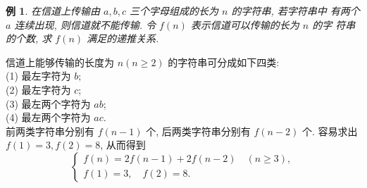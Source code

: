 \documentclass[punct]{ctexbeamer}
\newtheorem{ex}{例}[section]
\def\sol{\noindent {\bf 解\ }}
\begin{document}
\begin{frame}
	\begin{ex}
		在信道上传输由 $a, b, c$ 三个字母组成的长为 $n$ 的字符串, 若字符串中 有两个 $a$ 连续出现, 则信道就不能传输. 令 $f(n)$ 表示信道可以传输的长为 $n$ 的字 符串的个数, 求 $f(n)$ 满足的递推关系.
	\end{ex}
\pause\sol
信道上能够传输的长度为 $n(n \geqslant 2)$ 的字符串可分成如下四类:\\
(1) 最左字符为 $b$;\\
(2) 最左字符为 $c$;\\
(3) 最左两个字符为 $a b$;\\
(4) 最左两个字符为 $a c$.\\
前两类字符串分别有 $f(n-1)$ 个, 后两类字符串分别有 $f(n-2)$ 个. 容易求出 $f(1)=3, f(2)=8$, 从而得到
$$
\left\{\begin{array}{l}
f(n)=2 f(n-1)+2 f(n-2) \quad(n \geqslant 3), \\
f(1)=3, \quad f(2)=8 .
\end{array}\right.
$$
\end{frame}
\end{document}
